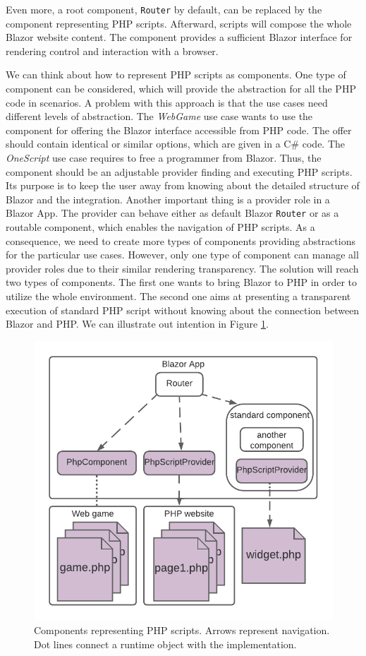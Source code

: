Even more, a root component, \texttt{Router} by default, can be replaced by the component representing PHP scripts.
Afterward, scripts will compose the whole Blazor website content.
The component provides a sufficient Blazor interface for rendering control and interaction with a browser. 
\par
We can think about how to represent PHP scripts as components.
One type of component can be considered, which will provide the abstraction for all the PHP code in scenarios.
A problem with this approach is that the use cases need different levels of abstraction.
The \textit{WebGame} use case wants to use the component for offering the Blazor interface accessible from PHP code.
The offer should contain identical or similar options, which are given in a C\# code.
The \textit{OneScript} use case requires to free a programmer from Blazor.
Thus, the component should be an adjustable provider finding and executing PHP scripts.
Its purpose is to keep the user away from knowing about the detailed structure of Blazor and the integration.
Another important thing is a provider role in a Blazor App.
The provider can behave either as default Blazor \texttt{Router} or as a routable component, which enables the navigation of PHP scripts.
As a consequence, we need to create more types of components providing abstractions for the particular use cases.
However, only one type of component can manage all provider roles due to their similar rendering transparency.
The solution will reach two types of components.
The first one wants to bring Blazor to PHP in order to utilize the whole environment.
The second one aims at presenting a transparent execution of standard PHP script without knowing about the connection between Blazor and PHP.
We can illustrate out intention in Figure \ref{img12:component}.
\par
\begin{figure}
\centering
\includegraphics[scale=0.9]{./img/Components}
\caption{Components representing PHP scripts. Arrows represent navigation. 
Dot lines connect a runtime object with the implementation.
}
\label{img12:component}
\end{figure} 
